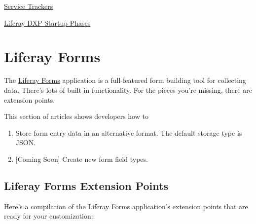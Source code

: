 \href{/docs/7-1/tutorials/-/knowledge_base/t/service-trackers}{Service
Trackers}

\href{/docs/7-1/reference/-/knowledge_base/r/liferay-startup-phases}{Liferay
DXP Startup Phases}

\chapter{Liferay Forms}\label{liferay-forms}

The \href{/docs/7-2/user/-/knowledge_base/u/forms}{Liferay Forms}
application is a full-featured form building tool for collecting data.
There's lots of built-in functionality. For the pieces you're missing,
there are extension points.

This section of articles shows developers how to

\begin{enumerate}
\def\labelenumi{\arabic{enumi}.}
\item
  Store form entry data in an alternative format. The default storage
  type is JSON.
\item
  {[}Coming Soon{]} Create new form field types.
\end{enumerate}

\section{Liferay Forms Extension
Points}\label{liferay-forms-extension-points}

Here's a compilation of the Liferay Forms application's extension points
that are ready for your customization:


